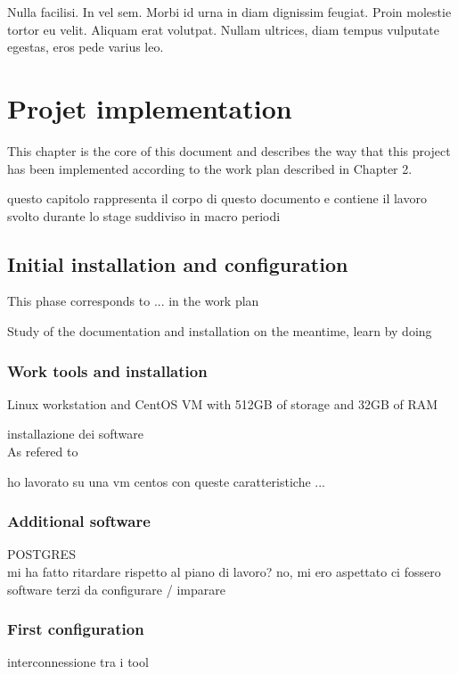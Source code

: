 \begin{savequote}[75mm]
Nulla facilisi. In vel sem. Morbi id urna in diam dignissim feugiat. Proin molestie tortor eu velit. Aliquam erat volutpat. Nullam ultrices, diam tempus vulputate egestas, eros pede varius leo.
\end{savequote}

\chapter{Projet implementation}

This chapter is the core of this document and describes the way that this project has been implemented according to the work plan described in Chapter 2.

questo capitolo rappresenta il corpo di questo documento e contiene il lavoro svolto durante lo stage suddiviso in macro periodi

\section{Initial installation and configuration}

	This phase corresponds to ... in the work plan
	
	Study of the documentation and installation on the meantime, learn by doing
	
	\subsection{Work tools and installation}
		
		Linux workstation and CentOS VM with 512GB of storage and 32GB of RAM
	
		installazione dei software\\
		
		As refered to 
		
		ho lavorato su una vm centos con queste caratteristiche ...
		
	\subsection{Additional software}
		POSTGRES\\
		mi ha fatto ritardare rispetto al piano di lavoro? no, mi ero aspettato ci fossero software terzi da configurare / imparare
	
	\subsection{First configuration}
		interconnessione tra i tool
	
